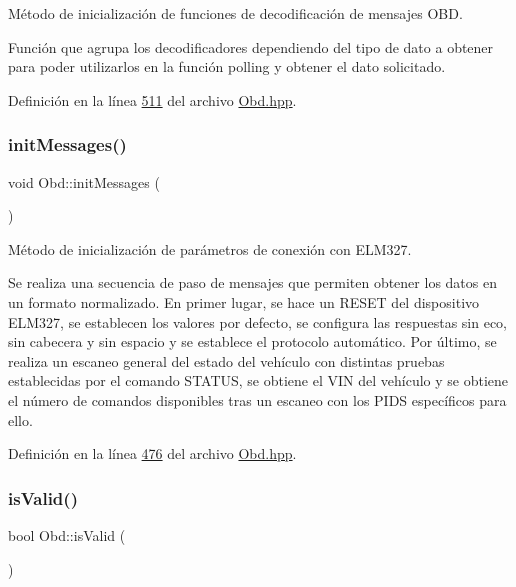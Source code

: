 Método de inicialización de funciones de decodificación de mensajes O\+BD. 

Función que agrupa los decodificadores dependiendo del tipo de dato a obtener para poder utilizarlos en la función polling y obtener el dato solicitado. 

Definición en la línea \hyperlink{Obd_8hpp_source_l00511}{511} del archivo \hyperlink{Obd_8hpp_source}{Obd.\+hpp}.

\mbox{\label{classObd_a5091314ed8068800cce40e7a74a3731e}} 
\subsubsection{\texorpdfstring{init\+Messages()}{initMessages()}}
{\footnotesize\ttfamily void Obd\+::init\+Messages (\begin{DoxyParamCaption}{ }\end{DoxyParamCaption})\hspace{0.3cm}{\ttfamily [inline]}}



Método de inicialización de parámetros de conexión con E\+L\+M327. 

Se realiza una secuencia de paso de mensajes que permiten obtener los datos en un formato normalizado. En primer lugar, se hace un R\+E\+S\+ET del dispositivo E\+L\+M327, se establecen los valores por defecto, se configura las respuestas sin eco, sin cabecera y sin espacio y se establece el protocolo automático. Por último, se realiza un escaneo general del estado del vehículo con distintas pruebas establecidas por el comando S\+T\+A\+T\+US, se obtiene el V\+IN del vehículo y se obtiene el número de comandos disponibles tras un escaneo con los P\+I\+DS específicos para ello. 

Definición en la línea \hyperlink{Obd_8hpp_source_l00476}{476} del archivo \hyperlink{Obd_8hpp_source}{Obd.\+hpp}.

\mbox{\label{classObd_ae28b765bb787467f929eae932133d2aa}} 
\subsubsection{\texorpdfstring{is\+Valid()}{isValid()}}
{\footnotesize\ttfamily bool Obd\+::is\+Valid (\begin{DoxyParamCaption}{ }\end{DoxyParamCaption})\hspace{0.3cm}{\ttfamily [inline]}}



